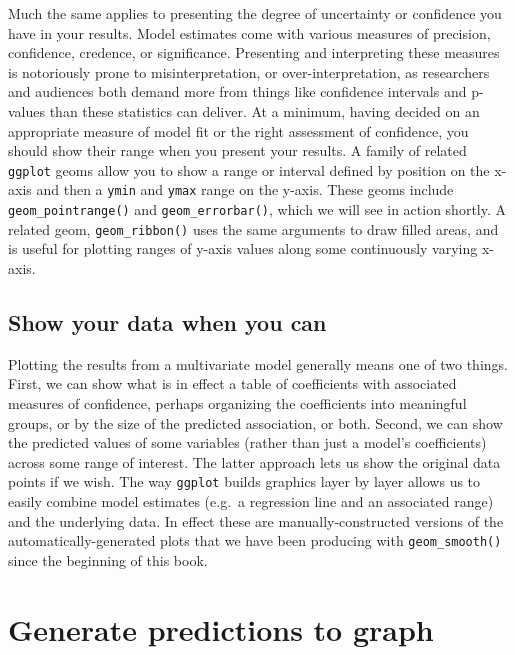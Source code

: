 \documentclass[]{book}
\begin{document}
Much the same applies to presenting the degree of uncertainty or confidence you have in your results. Model estimates come with various measures of precision, confidence, credence, or significance. Presenting and interpreting these measures is notoriously prone to misinterpretation, or over-interpretation, as researchers and audiences both demand more from things like confidence intervals and p-values than these statistics can deliver. At a minimum, having decided on an appropriate measure of model fit or the right assessment of confidence, you should show their range when you present your results. A family of related \texttt{ggplot} geoms allow you to show a range or interval defined by position on the x-axis and then a \texttt{ymin} and \texttt{ymax} range on the y-axis. These geoms include \texttt{geom\_pointrange()} and \texttt{geom\_errorbar()}, which we will see in action shortly. A related geom, \texttt{geom\_ribbon()} uses the same arguments to draw filled areas, and is useful for plotting ranges of y-axis values along some continuously varying x-axis.

\hypertarget{show-your-data-when-you-can}{%
\subsection{Show your data when you can}\label{show-your-data-when-you-can}}

Plotting the results from a multivariate model generally means one of two things. First, we can show what is in effect a table of coefficients with associated measures of confidence, perhaps organizing the coefficients into meaningful groups, or by the size of the predicted association, or both. Second, we can show the predicted values of some variables (rather than just a model's coefficients) across some range of interest. The latter approach lets us show the original data points if we wish. The way \texttt{ggplot} builds graphics layer by layer allows us to easily combine model estimates (e.g.~a regression line and an associated range) and the underlying data. In effect these are manually-constructed versions of the automatically-generated plots that we have been producing with \texttt{geom\_smooth()} since the beginning of this book.

\hypertarget{generate-predictions-to-graph}{%
\section{Generate predictions to graph}\label{generate-predictions-to-graph}}
\end{document}
